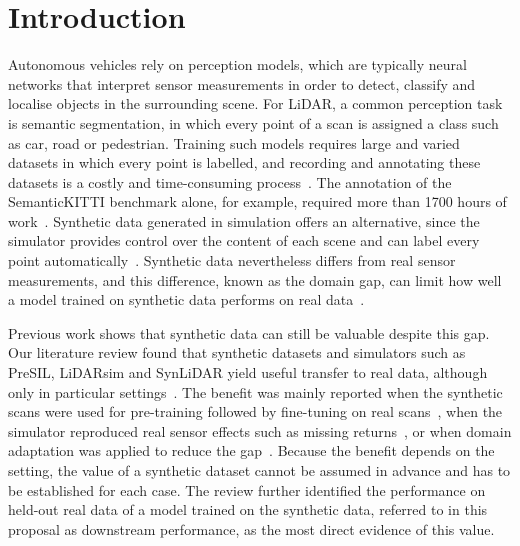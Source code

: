 \section{Introduction}\label{sec:intro}
Autonomous vehicles rely on perception models, which are typically neural networks that interpret sensor measurements in order to detect, classify and localise objects in the surrounding scene. For LiDAR, a common perception task is semantic segmentation, in which every point of a scan is assigned a class such as car, road or pedestrian. Training such models requires large and varied datasets in which every point is labelled, and recording and annotating these datasets is a costly and time-consuming process~\cite{xiaoTransferLearningSynthetic2022}. The annotation of the SemanticKITTI benchmark alone, for example, required more than 1700 hours of work~\cite{behleySemanticKITTIDatasetSemantic2019a}. Synthetic data generated in simulation offers an alternative, since the simulator provides control over the content of each scene and can label every point automatically~\cite{hurlPreciseSyntheticImage2019,xiaoTransferLearningSynthetic2022}. Synthetic data nevertheless differs from real sensor measurements, and this difference, known as the domain gap, can limit how well a model trained on synthetic data performs on real data~\cite{hurlPreciseSyntheticImage2019,manivasagamLiDARsimRealisticLiDAR2020a}.

Previous work shows that synthetic data can still be valuable despite this gap. Our literature review found that synthetic datasets and simulators such as PreSIL, LiDARsim and SynLiDAR yield useful transfer to real data, although only in particular settings~\cite{hurlPreciseSyntheticImage2019,manivasagamLiDARsimRealisticLiDAR2020a,xiaoTransferLearningSynthetic2022}. The benefit was mainly reported when the synthetic scans were used for pre-training followed by fine-tuning on real scans~\cite{hurlPreciseSyntheticImage2019}, when the simulator reproduced real sensor effects such as missing returns~\cite{manivasagamLiDARsimRealisticLiDAR2020a}, or when domain adaptation was applied to reduce the gap~\cite{xiaoTransferLearningSynthetic2022}. Because the benefit depends on the setting, the value of a synthetic dataset cannot be assumed in advance and has to be established for each case. The review further identified the performance on held-out real data of a model trained on the synthetic data, referred to in this proposal as downstream performance, as the most direct evidence of this value.

